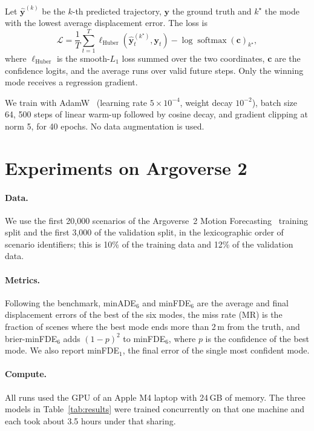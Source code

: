 \documentclass[10pt]{article}
\begin{document}
Let $\hat{\mathbf{y}}^{(k)}$ be the $k$-th predicted trajectory, $\mathbf{y}$ the ground truth
and $k^\star$ the mode with the lowest average displacement error. The loss is
\begin{equation}
\mathcal{L} = \frac{1}{T}\sum_{t=1}^{T} \ell_{\text{Huber}}\!\left(\hat{\mathbf{y}}^{(k^\star)}_t,
\mathbf{y}_t\right) - \log \operatorname{softmax}(\mathbf{c})_{k^\star},
\end{equation}
where $\ell_{\text{Huber}}$ is the smooth-$L_1$ loss summed over the two coordinates,
$\mathbf{c}$ are the confidence logits, and the average runs over valid future steps. Only the
winning mode receives a regression gradient.

We train with AdamW~\cite{loshchilov2019adamw} (learning rate $5\times10^{-4}$, weight decay
$10^{-2}$), batch size 64, 500 steps of linear warm-up followed by cosine decay, and gradient
clipping at norm 5, for 40 epochs. No data augmentation is used.

\section{Experiments on Argoverse 2}
\label{sec:results}

\paragraph{Data.} We use the first 20{,}000 scenarios of the Argoverse~2 Motion
Forecasting~\cite{wilson2021argoverse2} training split and the first 3{,}000 of the validation
split, in the lexicographic order of scenario identifiers; this is 10\% of the training data
and 12\% of the validation data.

\paragraph{Metrics.} Following the benchmark, minADE$_6$ and minFDE$_6$ are the average and
final displacement errors of the best of the six modes, the miss rate (MR) is the fraction of
scenes where the best mode ends more than 2\,m from the truth, and brier-minFDE$_6$ adds
$(1-p)^2$ to minFDE$_6$, where $p$ is the confidence of the best mode. We also report
minFDE$_1$, the final error of the single most confident mode.

\paragraph{Compute.} All runs used the GPU of an Apple M4 laptop with 24\,GB of memory. The
three models in Table~\ref{tab:results} were trained concurrently on that one machine and each
took about 3.5 hours under that sharing.
\end{document}
